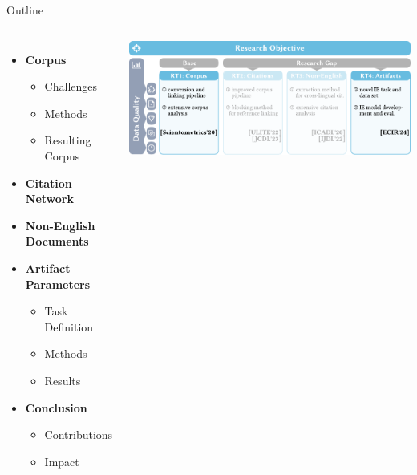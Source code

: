 \documentclass[en,16:9,smallfoot]{sdqbeamer}
\begin{document}
   \begin{frame}{Outline}
   \begin{columns}
           \begin{itemize}
               \item \textbf{Corpus}
               \begin{itemize}
                   \item Challenges
                   \item Methods
                   \item Resulting Corpus
               \end{itemize}
               \item {\color{contextgrey}\textbf{Citation Network}}
               \item {\color{contextgrey}\textbf{Non-English Documents}}
               \item \textbf{Artifact Parameters}
               \begin{itemize}
                   \item Task Definition
                   \item Methods
                   \item Results
               \end{itemize}
               \item \textbf{Conclusion}
               \begin{itemize}
                   \item Contributions
                   \item Impact
               \end{itemize}
           \end{itemize}
            \includegraphics[width=\linewidth]{imgs/objective_grid_and_contrib_7}
   \end{columns}
   \end{frame}

\end{document}

